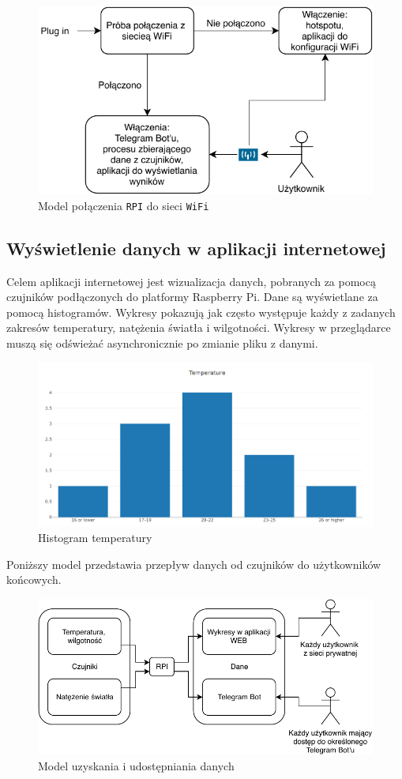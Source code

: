 \documentclass[a4paper]{article}
\begin{document}
\begin{figure}[h!]
  \centering
  \includegraphics[scale=1]{diagram2.pdf}
  \caption{Model połączenia \texttt{RPI} do sieci \texttt{WiFi}}
\end{figure}


\newpage
\subsection{Wyświetlenie danych w aplikacji internetowej}
Celem aplikacji internetowej jest wizualizacja danych, pobranych za pomocą czujników podłączonych do platformy Raspberry Pi.
Dane są wyświetlane za pomocą histogramów. Wykresy pokazują jak często występuje każdy z zadanych zakresów temperatury, natężenia światła i wilgotności.
Wykresy w przeglądarce muszą się odświeżać asynchronicznie po zmianie pliku z danymi.
\begin{figure}[H]
\centering
\includegraphics[scale=0.3]{exampleChart.png}
\caption{Histogram temperatury}
\end{figure}
Poniższy model przedstawia przepływ danych od czujników do użytkowników 
końcowych.
\begin{figure}[h!]
  \centering
  \includegraphics[scale=1]{diagram1.pdf}
  \caption{Model uzyskania i udostępniania danych}
\end{figure}
\end{document}
